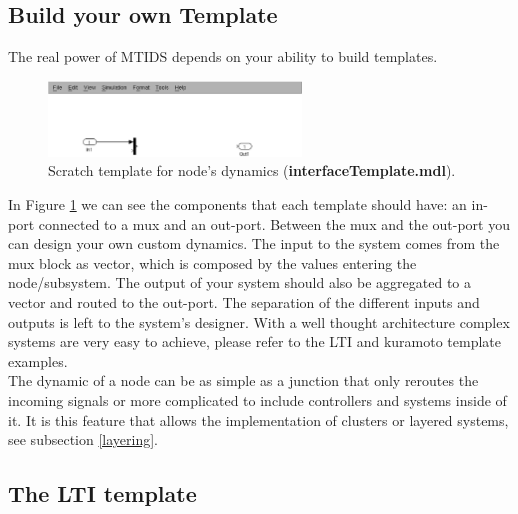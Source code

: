 \documentclass[a4paper,twoside, openright,12pt]{report}
\begin{document}
\subsection{Build your own Template} \label{nodeTemplate}
The real power of MTIDS depends on your ability to build templates. 
\\
\begin{figure}[htb]
\centering
\includegraphics[width=0.6\textwidth]{pics/screenBuildTemplate.eps}
\caption[MTIDS node's scratch Template]{Scratch template for node's dynamics (\textbf{interfaceTemplate.mdl}). }
\label{templateFig}
\end{figure}

In Figure \ref{templateFig} we can see the components that each template should have: an in-port connected to a mux and an out-port.
Between the mux and the out-port you can design your own custom dynamics. The input to the system comes from the mux block as vector, which is composed by the values
entering the node/subsystem. The output of your system should also be aggregated to a vector and routed to the out-port. The separation of the different inputs and outputs 
is left to the system's designer. With a well thought architecture complex systems are very easy to achieve, please refer to the LTI and kuramoto template examples.  
\\

The dynamic of a node can be as simple as a junction that only reroutes the incoming signals or more complicated to include controllers and systems inside of it. It is this feature that allows
the implementation of clusters or layered systems, see subsection \ref{layering}. 


\subsection{The LTI template}
\end{document}

